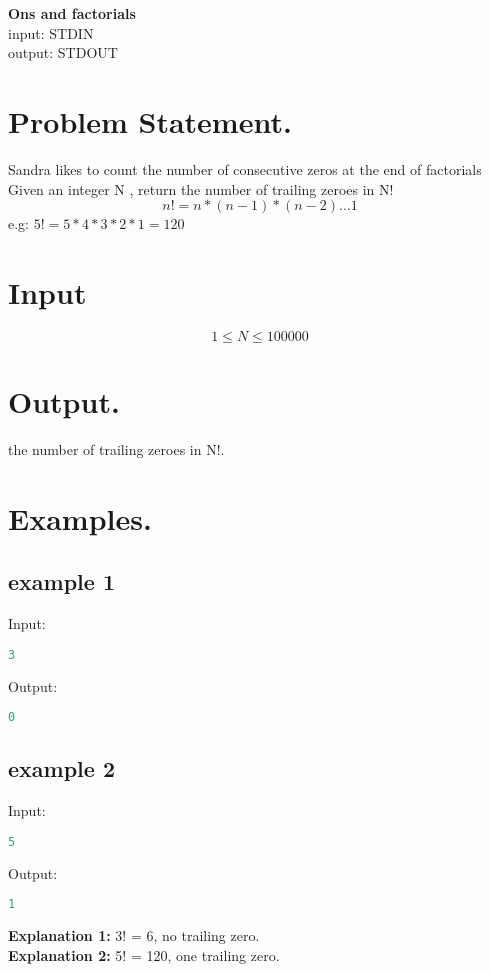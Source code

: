 \documentclass[10pt]{article}
\begin{document}
\begin{center}
    \Huge { \textbf{Ons and factorials}}\\
    \normalsize  { input:  STDIN}\\
    \normalsize{    output: STDOUT}
\end{center}
\section{Problem Statement.}
Sandra likes to count the number of consecutive zeros at the end of factorials\\
Given an integer N , return the number of trailing zeroes in N! 
$$ n!= n*(n-1)*(n-2)...1 $$
e.g: $ 5!=5*4*3*2*1=120 $
\paragraph{}
\section{Input}
$$ 1\le N \le 100000 $$
\section{Output.}
the number of trailing zeroes in N!.
\section{Examples.}
\subsection{example 1}
Input:
\begin{lstlisting}[language=Python]
3
\end{lstlisting}
Output:
\begin{lstlisting}[language=Python]
0
\end{lstlisting}

\subsection{example 2}
Input:
\begin{lstlisting}[language=Python]
5
\end{lstlisting}
Output:
\begin{lstlisting}[language=Python]
1
\end{lstlisting}
\textbf{Explanation 1:} 3! = 6, no trailing zero.\\
\textbf{Explanation 2:} 5! = 120, one trailing zero.
\end{document}
